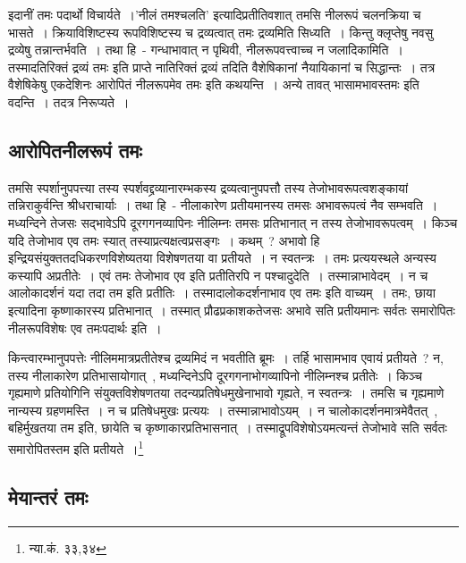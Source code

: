 	इदानीं तमः पदार्थो विचार्यते~।'नीलं तमश्चलति' इत्यादिप्रतीतिवशात् तमसि नीलरूपं चलनक्रिया च भासते~। क्रियाविशिष्टस्य रूपविशिष्टस्य च द्रव्यत्वात् तमः द्रव्यमिति सिध्यति~। किन्तु क्लृप्तेषु नवसु द्रव्येषु तन्नान्तर्भवति~। तथा हि~- गन्धाभावात् न पृथिवी, नीलरूपवत्त्वाच्च न जलादिकामिति~। तस्मादतिरिक्तं द्रव्यं तमः‌ इति प्राप्ते नातिरिक्तं द्रव्यं तदिति वैशेषिकानां नैयायिकानां च सिद्धान्तः~। तत्र वैशेषिकेषु एकदेशिनः आरोपितं नीलरूपमेव तमः इति कथयन्ति~। अन्ये तावत् भासामभावस्तमः इति वदन्ति~। तदत्र निरूप्यते~।

		\subsection{आरोपितनीलरूपं तमः}

		तमसि स्पर्शानुपपत्त्या तस्य स्पर्शवद्द्रव्यानारम्भकस्य द्रव्यत्वानुपपत्तौ तस्य तेजोभावरूपत्वशङ्कायां तन्निराकुर्वन्ति श्रीधराचार्याः~। तथा हि~- नीलाकारेण प्रतीयमानस्य तमसः अभावरूपत्वं नैव सम्भवति~। मध्यन्दिने तेजसः सद्भावेऽपि दूरगगनव्यापिनः नीलिम्नः तमसः प्रतिभानात् न तस्य तेजोभावरूपत्वम्~। किञ्च यदि तेजोभाव एव तमः स्यात् तस्याप्रत्यक्षत्वप्रसङ्गः~। कथम्~? अभावो हि इन्द्रियसंयुक्ततदधिकरणविशेष्यतया विशेषणतया वा प्रतीयते~। न स्वतन्त्रः~। तमः प्रत्ययस्थले अन्यस्य कस्यापि अप्रतीतेः~। एवं तमः तेजोभाव एव इति प्रतीतिरपि न पश्चादुदेति~। तस्मान्नाभावेदम्~। न च आलोकादर्शनं यदा तदा तम इति प्रतीतिः~। तस्मादालोकदर्शनाभाव एव तमः इति वाच्यम्~। तमः, छाया इत्यादिना कृष्णाकारस्य प्रतिभानात्~। तस्मात् प्रौढप्रकाशकतेजसः अभावे सति प्रतीयमानः  सर्वतः समारोपितः  नीलरूपविशेषः एव तमःपदार्थः इति~।

		{\fontsize{11.7}{0}\selectfont\s किन्त्वारम्भानुपपत्तेः नीलिममात्रप्रतीतेश्च द्रव्यमिदं न भवतीति ब्रूमः~। तर्हि भासामभाव एवायं प्रतीयते~? न, तस्य नीलाकारेण प्रतिभासायोगात्~, मध्यन्दिनेऽपि दूरगगनाभोगव्यापिनो नीलिम्नश्च प्रतीतेः~। किञ्च गृह्यमाणे प्रतियोगिनि संयुक्तविशेषणतया तदन्यप्रतिषेधमुखेनाभावो गृह्यते, न स्वतन्त्रः~। तमसि च गृह्यमाणे नान्यस्य ग्रहणमस्ति~। न च प्रतिषेधमुखः प्रत्ययः~। तस्मान्नाभावोऽयम्~। न चालोकादर्शनमात्रमेवैतत्~, बहिर्मुखतया तम इति, छायेति च कृष्णाकारप्रतिभासनात्~। तस्माद्रूपविशेषोऽयमत्यन्तं तेजोभावे सति सर्वतः समारोपितस्तम इति प्रतीयते~।\footnote{न्या.कं. ३३,३४}}


		\subsection{मेयान्तरं तमः}

